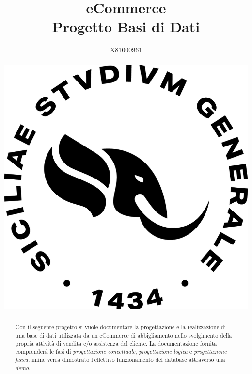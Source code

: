 \documentclass{article}
\title{eCommerce\\ \small{Progetto Basi di Dati}}
\date{}
\author{X81000961\\\\\includegraphics[scale=0.2]{images/unict-logo.png}}
\begin{document}
\maketitle

\begin{abstract}
Con il seguente progetto si vuole documentare la progettazione e la realizzazione di una base di dati utilizzata da un eCommerce di abbigliamento nello svolgimento della propria attività di vendita e/o assistenza del cliente. La documentazione fornita comprenderà le fasi di \textit{progettazione concettuale}, \textit{progettazione logica} e \textit{progettazione fisica}, infine verrà dimostrato l'effettivo funzionamento del database attraverso una \textit{demo}.
\end{abstract}
\newpage

\tableofcontents

\newpage

\end{document}
